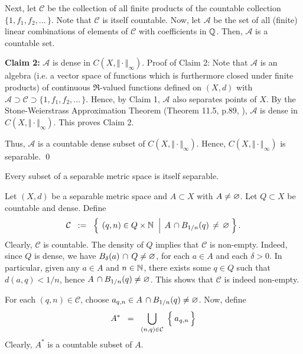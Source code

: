 \vskip 0.5cm
\noindent
Next, let $\mathcal{C}$ be the collection of all finite products of the countable collection
$\{1, f_{1}, f_{2}, \ldots\,\}$. 
Note that $\mathcal{C}$ is itself countable. Now, let $\mathcal{A}$ be the set of all
(finite) linear combinations of elements of $\mathcal{C}$ with coefficients in $\mathbb{Q}$.
Then, $\mathcal{A}$ is a countable set.

\vskip 0.5cm
\noindent
\textbf{Claim 2:}\;\; $\mathcal{A}$ is dense in $C(X,\Vert\cdot\Vert_{\infty})$.
\vskip 0.1cm
\noindent
Proof of Claim 2:\;\;
Note that $\mathcal{A}$ is an algebra (i.e. a vector space of functions
which is furthermore closed under finite products) of continuous $\Re$-valued
functions defined on $(X,d)$ with
$\mathcal{A} \supset \mathcal{C} \supset \{1,f_{1},f_{2},\ldots\,\}$. 
Hence, by Claim 1, $\mathcal{A}$ also separates points of $X$.
By the Stone-Weierstrass Approximation Theorem (Theorem 11.5, p.89, \cite{Aliprantis1998}),
$\mathcal{A}$ is dense in $C(X,\Vert\cdot\Vert_{\infty})$.
This proves Claim 2.

\vskip 0.5cm
\noindent
Thus, $\mathcal{A}$ is a countable dense subset of $C(X,\Vert\cdot\Vert_{\infty})$.
Hence, $C(X,\Vert\cdot\Vert_{\infty})$ is separable.
\qed


\vskip 0.5cm
\begin{proposition}
\label{EverySubsetOfSeparableMetricSpaceIsSeparable}
\mbox{}\vskip 0.1cm
\noindent
Every subset of a separable metric space is itself separable.
\end{proposition}
\proof
Let $(X,d)$ be a separable metric space and $A \subset X$ with $A \neq \varnothing$.
Let $Q \subset X$ be countable and dense.
Define
\begin{equation*}
\mathcal{C}
\;\; := \;\;
	\left\{\;
	\left.
	(q,n) \overset{{\color{white}.}}{\in} Q \times \N
	\;\;\right\vert\;
	A \,\cap B_{1/n}(q) \,\neq\, \varemptyset
	\;\right\}.
\end{equation*}
Clearly, $\mathcal{C}$ is countable. The density of $Q$ implies that $\mathcal{C}$ is non-empty.
Indeed, since $Q$ is dense, we have $B_{\delta}(a) \,\cap\, Q \neq \varnothing$,
for each $a \in A$ and each $\delta > 0$. In particular, given any $a \in A$ and $n \in \mathbb{N}$,
there exists some $q \in Q$ such that $d(a,q) < 1/n$, hence
$A \, \cap B_{1/n}(q) \neq \varnothing$. This shows that $\mathcal{C}$ is indeed non-empty.

\vskip 0.3cm
\noindent
For each $(q,n) \in \mathcal{C}$, choose $a_{q,n} \in A\,\cap B_{1/n}(q) \neq \varnothing$.
Now, define
\begin{equation*}
A^{*} \;\; = \;\; \underset{(n,q)\in\mathcal{C}}{\bigcup}\; \left\{\, \overset{{\color{white}-}}{a}_{q,n} \,\right\}
\end{equation*}
Clearly, $A^{*}$ is a countable subset of $A$.

